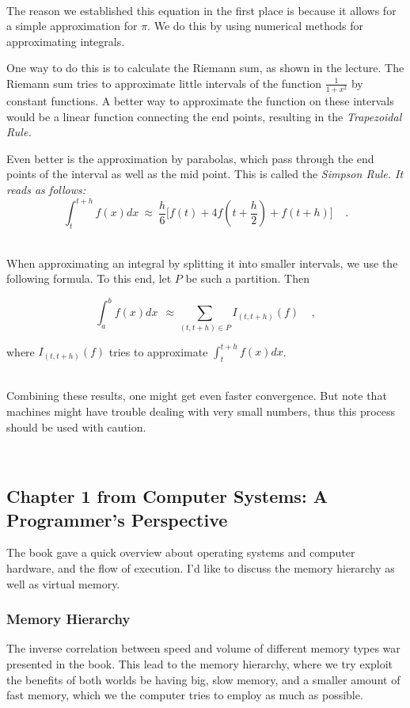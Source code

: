 \documentclass[../../main.tex]{subfiles}
\begin{document}
~\\
The reason we established this equation in the first place is because it allows for a simple approximation for $\pi$.
We do this by using numerical methods for approximating integrals.

One way to do this is to calculate the Riemann sum, as shown in the lecture.
The Riemann sum tries to approximate little intervals of the function $\frac{1}{1+x^2}$ by constant functions.
A better way to approximate the function on these intervals would be a linear function connecting the end points, resulting in the \em Trapezoidal Rule\em.

Even better is the approximation by parabolas, which pass through the end points of the interval as well as the mid point. This is called the \em Simpson Rule\em.
It reads as follows:
\[
    \int_{t}^{t+h} f(x) dx \ \approx \ \frac{h}{6} \Big[ f(t) + 4f(t+\frac{h}{2}) + f(t+h) \Big] \ \ \ \ \ .
\]

~\\
When approximating an integral by splitting it into smaller intervals, we use the following formula.
To this end, let $P$ be such a partition. Then

\[
    \int_{a}^{b} f(x) dx \ \ \approx \sum_{(t, t+h) \in P} I_{(t, t+h)}(f) \ \ \ \ \ ,
\]

where \(I_{(t, t+h)}(f)\) tries to approximate \(\int_{t}^{t+h} f(x) dx\).

~\\
Combining these results, one might get even faster convergence.
But note that machines might have trouble dealing with very small numbers, thus this process should be used with caution.

~\\
\subsection{Chapter 1 from Computer Systems: A Programmer's Perspective}
The book gave a quick overview about operating systems and computer hardware, and the flow of execution.
I'd like to discuss the memory hierarchy as well as virtual memory.

\subsubsection{Memory Hierarchy}
The inverse correlation between speed and volume of different memory types war presented in the book.
This lead to the memory hierarchy, where we try exploit the benefits of both worlds be having big, slow memory, and a smaller amount of fast memory, which we the computer tries to employ as much as possible.
\end{document}
